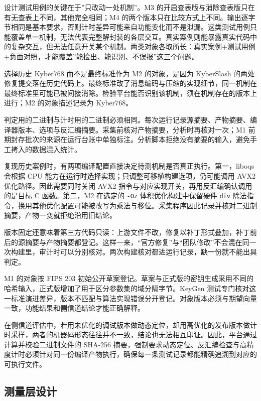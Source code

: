 设计测试用例的关键在于”只改动一处机制”。M3 的开启查表版与消除查表版只在有无查表上不同，其他完全相同；M4 的两个版本只在比较方式上不同。输出逐字节相同是基本要求，否则计时差异可能来自功能变化而不是泄漏。这类测试用例只能覆盖单一机制，无法代表完整解封装的各层交互。真实案例则能暴露真实代码中的复杂交互，但无法任意开关某个机制。两类对象各取所长：真实案例+测试用例+负面对照，才能覆盖”能检出、能识别、不误报”这三个问题。

选择历史 Kyber768 而不是最终标准作为 M2 的对象，是因为 KyberSlash 的两处修复提交落在历史代码上。最终标准改了消息编码与压缩的实现细节，同一机制在最终标准里可能已被间接消除。检验平台能否识别该机制，须在机制存在的版本上进行；M2 的对象描述记录为 Kyber768。

判定用的二进制与计时用的二进制必须相同。每次运行记录源摘要、产物摘要、编译器版本、选项与反汇编摘要。采集前核对产物摘要，分析时再核对一次；M1 前期封存批次的来源在运行台账中单独标注。分析脚本拒绝没有摘要的输入，避免手工拷入的数据混入统计。

复现历史案例时，有两项编译配置直接决定待测机制是否真正执行。第一，liboqs 会根据 CPU 能力在运行时选择实现；只调整可移植构建选项，仍可能调用 AVX2 优化路径。因此需要同时关闭 AVX2 指令与对应实现开关，再用反汇编确认调用的是目标 C 函数。第二，M2 在选定的 \texttt{-Oz} 体积优化构建中保留硬件 \texttt{div} 除法指令，换用其他优化配置可能被改写为乘法与移位。采集程序因此记录并核对二进制摘要，产物一变就拒绝沿用旧结论。

版本固定还意味着第三方代码只读：上游文件不改，修复以补丁形式叠加，补丁前后的源摘要与产物摘要都登记。这样一来，“官方修复”与“团队修改”不会混在同一次构建里，审计时可以分别核对。两次构建核对都进运行记录，缺一份就不能出具判定。

M1 的对象按 FIPS 203 初始公开草案登记。草案与正式版的密钥生成采用不同的哈希输入，正式版增加了用于区分参数集的域分隔字节。KeyGen 测试专门核对这一标准演进差异，版本不匹配与算法实现错误分开登记。对象版本必须与期望向量一致，功能结果和侧信道结论才能正确解释。

在侧信道评估中，若用未优化的调试版本做动态定位，却用高优化的发布版本做计时采样，两者的机器码形态往往并不一致，结论也无法相互印证。因此，平台通过计算并校验二进制文件的 SHA-256 摘要，强制要求动态定位、反汇编检查与高精度计时必须针对同一份编译产物执行，确保每一条测试记录都能精确追溯到对应的可执行文件。

\subsection{测量层设计}

